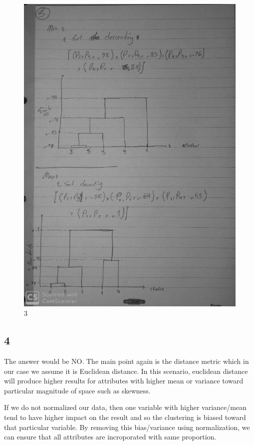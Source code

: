 \documentclass[11pt]{article}
\makeatletter
\def\maxwidth{\ifdim\Gin@nat@width>\linewidth\linewidth
    \else\Gin@nat@width\fi}
\let\Oldincludegraphics\includegraphics
\renewcommand{\includegraphics}[1]{\Oldincludegraphics[width=.8\maxwidth]{#1}}
\makeatother
\begin{document}
\begin{figure}
\centering
\includegraphics{wiki/3_.jpg}
\caption{3}
\end{figure}

    \hypertarget{section}{%
\subsection{4}\label{section}}

The answer would be NO. The main point again is the distance metric
which in our case we assume it is Euclidean distance. In this scenario,
euclidean distance will produce higher results for attributes with
higher mean or variance toward particular magnitude of space such as
skewness.

If we do not normalized our data, then one variable with higher
variance/mean tend to have higher impact on the result and so the
clustering is biased toward that particular variable. By removing this
bias/variance using normalization, we can ensure that all attributes are
incroporated with same proportion.
\end{document}
